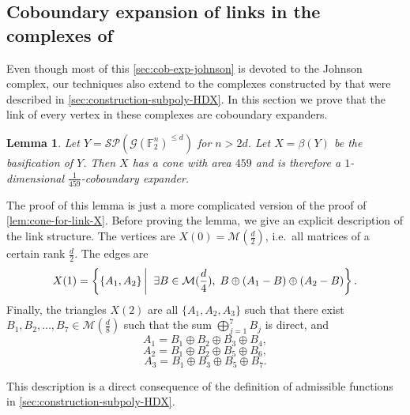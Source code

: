 \documentclass[10pt,a4paper]{article}
\newcommand{\prettyref}[1]{\cref{#1}}
\newtheorem{lemma}[theorem]{Lemma}
\theoremstyle{definition}
\theoremstyle{remark}
\newcommand\sett[2]{\left\{ #1 \left| \; \vphantom{#1 #2} \right. #2  \right\}}
\newcommand{\set}[1]{\{#1\}}
\newcommand{\F}{\mathbb{F}}
\renewcommand{\leq}{\leqslant}
\numberwithin{equation}{section}
\let\pref=\prettyref
\def\Y{Y}
\def\M{\mathcal{SP}}
\def\MP{\mathcal{M}}
\begin{document}
\subsection[Coboundary expansion of links in the complexes of Golowich]{Coboundary expansion of links in the complexes of \cite{Golowich2023}}
\label{sec:coboundary-Golowich}
Even though most of this \pref{sec:cob-exp-johnson} is devoted to the Johnson complex, our techniques also extend to the complexes constructed by \cite{Golowich2023} that were described in \pref{sec:construction-subpoly-HDX}. In this section we prove that the link of every vertex in these complexes are coboundary expanders.
\begin{lemma} \label{lem:louis-coboundary-expander}
    Let \(\Y=\M(\mathcal{G}(\F_2^n)^{\leq d})\) for \(n > 2d\). Let \(X = \beta(\Y)\) be the basification of \(Y\). Then \(X\) has a cone with area \(459\) and is therefore a $1$-dimensional \(\frac{1}{459}\)-coboundary expander.
\end{lemma}

The proof of this lemma is just a  more complicated version of the proof of \pref{lem:cone-for-link-X}. 
%
Before proving the lemma, we give an explicit description of the link structure. The vertices are \(X(0) = \MP(\frac{d}{2})\), i.e.\ all matrices of a certain rank \(\frac{d}{2}\). The edges are
\[X(1) = \sett{\set{A_1,A_2}}{\exists B \in \MP(\frac{d}{4}), \; B \oplus (A_1-B) \oplus (A_2-B)}.\]
Finally, the triangles \(X(2)\) are all \(\set{A_1,A_2,A_3}\) such that there exist \(B_1,B_2,\dots,B_7 \in \MP(\frac{d}{8})\) such that the sum \(\bigoplus_{j=1}^7 B_j\) is direct, and
\[A_1 = B_1\oplus B_2 \oplus B_3 \oplus B_4,\]
\[A_2 = B_1\oplus B_2 \oplus B_5 \oplus B_6,\]
\[A_3 = B_1\oplus B_3 \oplus B_5 \oplus B_7.\]

This description is a direct consequence of the definition of admissible functions in \pref{sec:construction-subpoly-HDX}.
\end{document}
